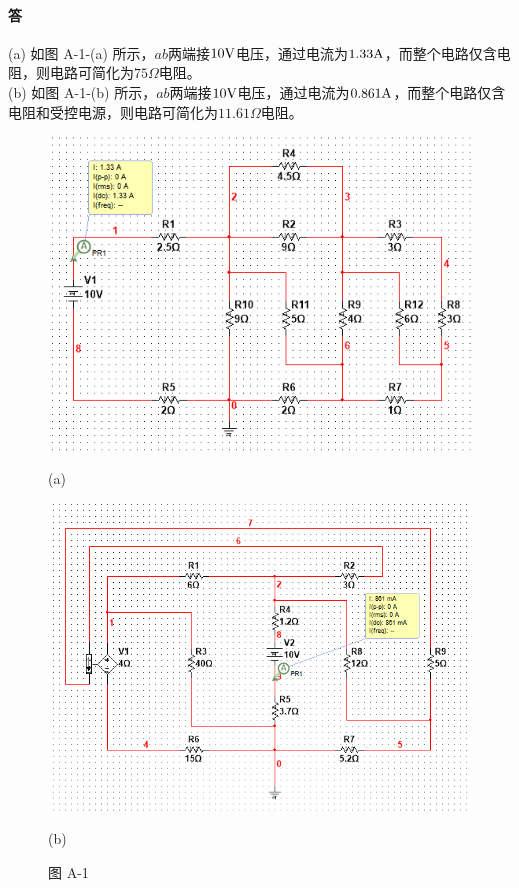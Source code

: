 \documentclass[hyperref, UTF8]{ctexart}
\newcommand{\volt}{{\rm V}}
\newcommand{\ampere}{{\rm A}}
\newcommand{\ohm}{\Omega}
\begin{document}
\paragraph{答}
(a) 如图 A-1-(a) 所示，$ab$两端接$10 \volt$电压，通过电流为$1.33 \ampere$，而整个电路仅含电阻，则电路可简化为$75\ohm$电阻。\\

(b) 如图 A-1-(b) 所示，$ab$两端接$10 \volt$电压，通过电流为$0.861 \ampere$，而整个电路仅含电阻和受控电源，则电路可简化为$11.61\ohm$电阻。

\begin{figure}[!htb]
\centering
\begin{minipage}[t]{0.359\textwidth}
\centering
\includegraphics[width=1\textwidth]{pA-1-a-sim.png}
\caption*{(a)}
\end{minipage}
\begin{minipage}[t]{0.425\textwidth}
\centering
\includegraphics[width=1\textwidth]{pA-1-b-sim.png}
\caption*{(b)}
\end{minipage}
\caption*{图 A-1}
\end{figure}
\end{document}
